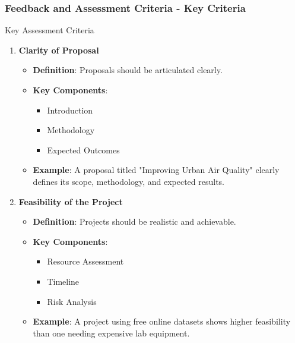 \documentclass[aspectratio=169]{beamer}
\begin{document}
\begin{frame}[fragile]
    \frametitle{Feedback and Assessment Criteria - Key Criteria}
    \begin{block}{Key Assessment Criteria}
        \begin{enumerate}
            \item \textbf{Clarity of Proposal}
                \begin{itemize}
                    \item \textbf{Definition}: Proposals should be articulated clearly.
                    \item \textbf{Key Components}:
                        \begin{itemize}
                            \item Introduction
                            \item Methodology
                            \item Expected Outcomes
                        \end{itemize}
                    \item \textbf{Example}: A proposal titled "Improving Urban Air Quality" clearly defines its scope, methodology, and expected results.
                \end{itemize}
                
            \item \textbf{Feasibility of the Project}
                \begin{itemize}
                    \item \textbf{Definition}: Projects should be realistic and achievable.
                    \item \textbf{Key Components}:
                        \begin{itemize}
                            \item Resource Assessment
                            \item Timeline
                            \item Risk Analysis
                        \end{itemize}
                    \item \textbf{Example}: A project using free online datasets shows higher feasibility than one needing expensive lab equipment.
                \end{itemize}
                

\end{enumerate}
\end{block}
\end{frame}
\end{document}
